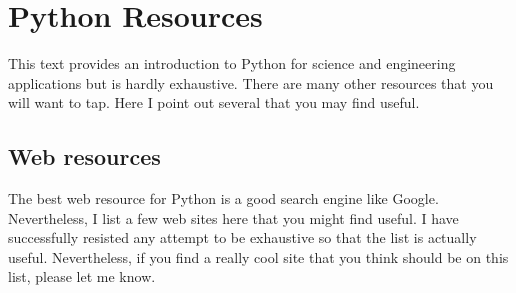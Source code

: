 \documentclass[letterpaper,10pt,english]{sphinxmanual}
\begin{document}
\chapter{Python Resources}
\label{apdx3/apdx3_resources:apdx2}\label{apdx3/apdx3_resources:python-resources}
This text provides an introduction to Python for science and engineering applications but is hardly exhaustive.  There are many other resources that you will want to tap.  Here I point out several that you may find useful.


\section{Web resources}
\label{apdx3/apdx3_resources:web-resources}
The best web resource for Python is a good search engine like Google.  Nevertheless, I list a few web sites here that you might find useful.  I have successfully resisted any attempt to be exhaustive so that the list is actually useful.  Nevertheless, if you find a really cool site that you think should be on this list, please let me know.
\end{document}
